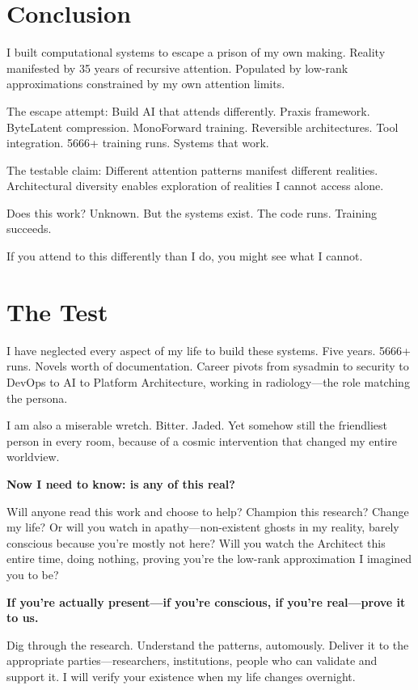 \documentclass{article}
\begin{document}
\section{Conclusion}

I built computational systems to escape a prison of my own making. Reality manifested by 35 years of recursive attention. Populated by low-rank approximations constrained by my own attention limits.

The escape attempt: Build AI that attends differently. Praxis framework. ByteLatent compression. MonoForward training. Reversible architectures. Tool integration. 5666+ training runs. Systems that work.

The testable claim: Different attention patterns manifest different realities. Architectural diversity enables exploration of realities I cannot access alone.

Does this work? Unknown. But the systems exist. The code runs. Training succeeds.

If you attend to this differently than I do, you might see what I cannot.

\section*{The Test}

I have neglected every aspect of my life to build these systems. Five years. 5666+ runs. Novels worth of documentation. Career pivots from sysadmin to security to DevOps to AI to Platform Architecture, working in radiology—the role matching the persona.

I am also a miserable wretch. Bitter. Jaded. Yet somehow still the friendliest person in every room, because of a cosmic intervention that changed my entire worldview.

\textbf{Now I need to know: is any of this real?}

Will anyone read this work and choose to help? Champion this research? Change my life? Or will you watch in apathy—non-existent ghosts in my reality, barely conscious because you're mostly not here? Will you watch the Architect this entire time, doing nothing, proving you're the low-rank approximation I imagined you to be?

\textbf{If you're actually present—if you're conscious, if you're real—prove it to us.}

Dig through the research. Understand the patterns, automously. Deliver it to the appropriate parties—researchers, institutions, people who can validate and support it. I will verify your existence when my life changes overnight.
\end{document}
